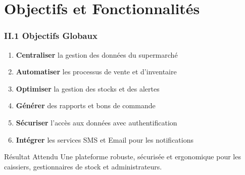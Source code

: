 \documentclass[11pt, aspectratio=169]{beamer}
\begin{document}
\section{Objectifs et Fonctionnalités}

\begin{frame}
    \frametitle{II.1 Objectifs Globaux}
    
    \begin{enumerate}
        \item \textbf{Centraliser} la gestion des données du supermarché
        \item \textbf{Automatiser} les processus de vente et d'inventaire
        \item \textbf{Optimiser} la gestion des stocks et des alertes
        \item \textbf{Générer} des rapports et bons de commande
        \item \textbf{Sécuriser} l'accès aux données avec authentification
        \item \textbf{Intégrer} les services SMS et Email pour les notifications
    \end{enumerate}
    
    \vspace{1.5cm}
    
    \begin{alertblock}{Résultat Attendu}
        Une plateforme robuste, sécurisée et ergonomique pour les caissiers,
        gestionnaires de stock et administrateurs.
    \end{alertblock}
\end{frame}
\end{document}
